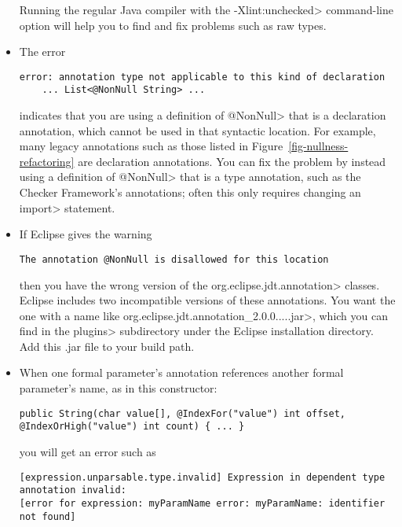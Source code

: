 \begin{itemize}
Running the regular Java compiler with the \<-Xlint:unchecked> command-line
option will help you to find and fix problems such as raw types.


\item
The error

\begin{Verbatim}
error: annotation type not applicable to this kind of declaration
    ... List<@NonNull String> ...
\end{Verbatim}

\noindent
indicates that you are using a definition of \<@NonNull> that is a
declaration annotation, which cannot be used in that syntactic location.
For example, many legacy annotations such as those listed in
Figure~\ref{fig-nullness-refactoring} are declaration annotations.  You can
fix the problem by instead using a definition of \<@NonNull> that is a type
annotation, such as the Checker Framework's annotations; often this only
requires changing an \<import> statement.


\item
If Eclipse gives the warning

\begin{Verbatim}
The annotation @NonNull is disallowed for this location
\end{Verbatim}

\noindent
then you have the wrong version of the \<org.eclipse.jdt.annotation>
classes.  Eclipse includes two incompatible versions of these annotations.
You want the one with a name like
\<org.eclipse.jdt.annotation\_2.0.0.....jar>, which you can find in the
\<plugins> subdirectory under the Eclipse installation directory.
Add this .jar file to your build path.


\item
When one formal parameter's annotation references another formal
parameter's name, as in this constructor:

\begin{smaller}
\begin{Verbatim}
public String(char value[], @IndexFor("value") int offset, @IndexOrHigh("value") int count) { ... }
\end{Verbatim}
\end{smaller}

\noindent
you will get an error such as

\begin{smaller}
\begin{Verbatim}[]
[expression.unparsable.type.invalid] Expression in dependent type annotation invalid:
[error for expression: myParamName error: myParamName: identifier not found]
\end{Verbatim}
\end{smaller}


\end{itemize}
